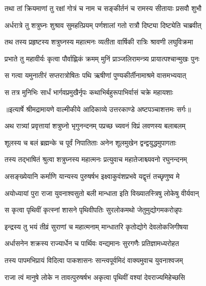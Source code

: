 \twolineshloka
{तथा तां क्रियमाणां तु रक्षां गोत्रं च नाम च}
{सङ्कीर्तनं च रामस्य सीतायाः प्रसवौ शुभौ} %

\twolineshloka
{अर्धरात्रे तु शत्रुघ्नः शुश्राव सुमहत्प्रियम्}
{पर्णशालां गतो रात्रौ दिष्ट्या दिष्ट्येति चाब्रवीत्} %

\twolineshloka
{तथ तस्य प्रहृष्टस्य शत्रुघ्नस्य महात्मनः}
{व्यतीता वार्षिकी रात्रिः श्रावणी लघुविक्रमा} %

\twolineshloka
{प्रभाते तु महावीर्यः कृत्वा पौर्वाह्णिकं क्रमम्}
{मुनिं प्राञ्जलिरामन्त्र्य प्रायात्पश्चान्मुखः पुनः} %

\twolineshloka
{स गत्वा यमुनातीरं सप्तरात्रोषितः पथि}
{ऋषीणां पुण्यकीर्तीनामाश्रमे वासमभ्ययात्} %

\twolineshloka
{स तत्र मुनिभिः सार्धं भार्गवप्रमुखैर्नृपः}
{कथाभिर्बहुरूपाभिर्वासं चक्रे महायशाः} %


{॥इत्यार्षे श्रीमद्रामायणे वाल्मीकीये आदिकाव्ये उत्तरकाण्डे अष्टपञ्चाशत्तमः सर्गः॥}


\twolineshloka
{अथ रात्र्यां प्रवृत्तायां शत्रुघ्नो भृगुनन्दनम्}
{पप्रच्छ च्यवनं विप्रं लवणस्य बलाबलम्} %

\twolineshloka
{शूलस्य च बलं ब्रह्मन्के च पूर्वं निपातिताः}
{अनेन शूलमुखेन द्वन्द्वयुद्धमुपागताः} %

\twolineshloka
{तस्य तद्भाषितं श्रुत्वा शत्रुघ्नस्य महात्मनः}
{प्रत्युवाच महातेजाश्च्यवनो रघुनन्दनम्} %

\twolineshloka
{असङ्ख्येयानि कर्माणि यान्यस्य पुरुषर्षभ}
{इक्ष्वाकुवंशप्रभवे यद्वृत्तं तच्छृणुष्व मे} %

\twolineshloka
{अयोध्यायां पुरा राजा युवनाश्वसुतो बली}
{मान्धाता इति विख्यातस्त्रिषु लोकेषु वीर्यवान्} %

\twolineshloka
{स कृत्वा पृथिवीं कृत्स्नां शासने पृथिवीपतिः}
{सुरलोकमथो जेतुमुद्योगमकरोन्नृपः} %

\twolineshloka
{इन्द्रस्य तु भयं तीव्रं सुराणां च महात्मनाम्}
{मान्धातरि कृतोद्योगे देवलोकजिगीषया} %

\twolineshloka
{अर्धासनेन शक्रस्य राज्यार्धेन च पार्थिवः}
{वन्द्यमानः सुरगणैः प्रतिज्ञामध्यरोहत} %

\twolineshloka
{तस्य पापमभिप्रायं विदित्वा पाकशासनः}
{सान्त्वपूर्वमिदं वाक्यमुवाच युवनाश्वजम्} %

\twolineshloka
{राजा त्वं मानुषे लोके न तावत्पुरुषर्षभ}
{अकृत्वा पृथिवीं वश्यां देवराज्यमिहेच्छसि} %

